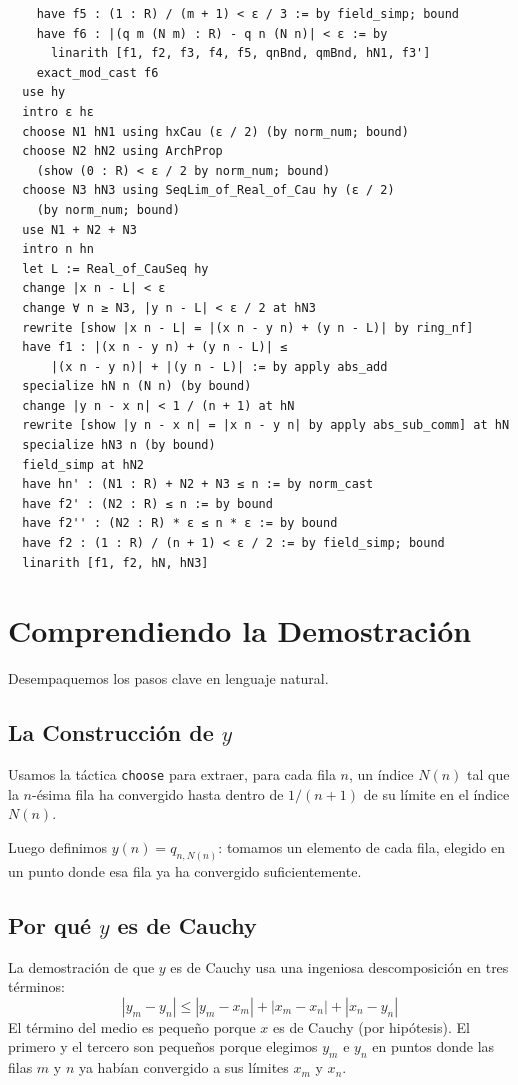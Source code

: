 \begin{verbatim}
    have f5 : (1 : R) / (m + 1) < ε / 3 := by field_simp; bound
    have f6 : |(q m (N m) : R) - q n (N n)| < ε := by
      linarith [f1, f2, f3, f4, f5, qnBnd, qmBnd, hN1, f3']
    exact_mod_cast f6
  use hy
  intro ε hε
  choose N1 hN1 using hxCau (ε / 2) (by norm_num; bound)
  choose N2 hN2 using ArchProp
    (show (0 : R) < ε / 2 by norm_num; bound)
  choose N3 hN3 using SeqLim_of_Real_of_Cau hy (ε / 2)
    (by norm_num; bound)
  use N1 + N2 + N3
  intro n hn
  let L := Real_of_CauSeq hy
  change |x n - L| < ε
  change ∀ n ≥ N3, |y n - L| < ε / 2 at hN3
  rewrite [show |x n - L| = |(x n - y n) + (y n - L)| by ring_nf]
  have f1 : |(x n - y n) + (y n - L)| ≤
      |(x n - y n)| + |(y n - L)| := by apply abs_add
  specialize hN n (N n) (by bound)
  change |y n - x n| < 1 / (n + 1) at hN
  rewrite [show |y n - x n| = |x n - y n| by apply abs_sub_comm] at hN
  specialize hN3 n (by bound)
  field_simp at hN2
  have hn' : (N1 : R) + N2 + N3 ≤ n := by norm_cast
  have f2' : (N2 : R) ≤ n := by bound
  have f2'' : (N2 : R) * ε ≤ n * ε := by bound
  have f2 : (1 : R) / (n + 1) < ε / 2 := by field_simp; bound
  linarith [f1, f2, hN, hN3]
\end{verbatim}

\section{Comprendiendo la Demostración}

Desempaquemos los pasos clave en lenguaje natural.

\subsection{La Construcción de $y$}

Usamos la táctica \texttt{choose} para extraer, para cada fila $n$, un índice $N(n)$
tal que la $n$-ésima fila ha convergido hasta dentro de $1/(n+1)$ de su límite en
el índice $N(n)$.

Luego definimos $y(n) = q_{n,N(n)}$: tomamos un elemento de cada fila, elegido en
un punto donde esa fila ya ha convergido suficientemente.

\subsection{Por qué $y$ es de Cauchy}

La demostración de que $y$ es de Cauchy usa una ingeniosa descomposición en tres
términos:
\[
  |y_m - y_n| \leq |y_m - x_m| + |x_m - x_n| + |x_n - y_n|
\]
El término del medio es pequeño porque $x$ es de Cauchy (por hipótesis). El
primero y el tercero son pequeños porque elegimos $y_m$ e $y_n$ en puntos donde
las filas $m$ y $n$ ya habían convergido a sus límites $x_m$ y $x_n$.

